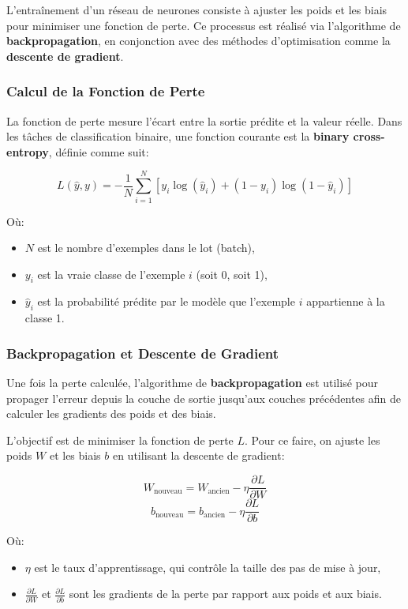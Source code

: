 L'entraînement d'un réseau de neurones consiste à ajuster les poids et les biais pour minimiser une fonction de perte. Ce processus est réalisé via l'algorithme de \textbf{backpropagation}, en conjonction avec des méthodes d'optimisation comme la \textbf{descente de gradient}.

\subsubsection{Calcul de la Fonction de Perte}

La fonction de perte mesure l'écart entre la sortie prédite et la valeur réelle. Dans les tâches de classification binaire, une fonction courante est la \textbf{binary cross-entropy}, définie comme suit:

\[
L(\hat{y}, y) = - \frac{1}{N} \sum_{i=1}^{N} \left[ y_i \log(\hat{y}_i) + (1 - y_i) \log(1 - \hat{y}_i) \right]
\]

Où:
\begin{itemize}
    \item \( N \) est le nombre d'exemples dans le lot (batch),
    \item \( y_i \) est la vraie classe de l'exemple \( i \) (soit 0, soit 1),
    \item \( \hat{y}_i \) est la probabilité prédite par le modèle que l'exemple \( i \) appartienne à la classe 1.
\end{itemize}

\subsubsection{Backpropagation et Descente de Gradient}

Une fois la perte calculée, l'algorithme de \textbf{backpropagation} est utilisé pour propager l'erreur depuis la couche de sortie jusqu'aux couches précédentes afin de calculer les gradients des poids et des biais. 

L'objectif est de minimiser la fonction de perte \( L \). Pour ce faire, on ajuste les poids \( W \) et les biais \( b \) en utilisant la descente de gradient:

\[
W_{\text{nouveau}} = W_{\text{ancien}} - \eta \frac{\partial L}{\partial W}
\]
\[
b_{\text{nouveau}} = b_{\text{ancien}} - \eta \frac{\partial L}{\partial b}
\]

Où:
\begin{itemize}
    \item \( \eta \) est le taux d'apprentissage, qui contrôle la taille des pas de mise à jour,
    \item \( \frac{\partial L}{\partial W} \) et \( \frac{\partial L}{\partial b} \) sont les gradients de la perte par rapport aux poids et aux biais.
\end{itemize}

